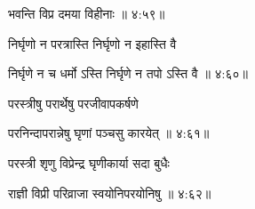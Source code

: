 

\nemslokad

{\devanagarifont भवन्ति विप्र दमया विहीनाः {॥ ४:५९॥} \veg\dontdisplaylinenum }%

\vfill
\pageparbreak
\vers


\vers


{\devanagarifont निर्घृणो न परत्रास्ति निर्घृणो न इहास्ति वै \thinspace{\dandab} \dontdisplaylinenum }%


{\devanagarifont निर्घृणे न च धर्मो ऽस्ति निर्घृणे न तपो ऽस्ति वै {॥ ४:६०॥} \veg\dontdisplaylinenum }%

{\devanagarifont परस्त्रीषु परार्थेषु परजीवापकर्षणे \thinspace{\dandab} \dontdisplaylinenum }%


{\devanagarifont परनिन्दापरान्नेषु घृणां पञ्चसु कारयेत् {॥ ४:६१॥} \veg\dontdisplaylinenum }%

{\devanagarifont परस्त्री शृणु विप्रेन्द्र घृणीकार्या सदा बुधैः \thinspace{\dandab} \dontdisplaylinenum }%


{\devanagarifont राज्ञी विप्री परिव्राजा स्वयोनिपरयोनिषु {॥ ४:६२॥} \veg\dontdisplaylinenum }%

